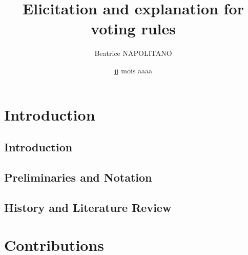 \documentclass[a4paper, 11pt,oneside]{book}
\title{Elicitation and explanation for voting rules}
\author{Beatrice NAPOLITANO}
\institute{l'Université Paris-Dauphine}
\date{jj mois aaaa}
\begin{document}
\hypersetup{pageanchor=false}
\begin{titlepage}
\maketitle{}
\end{titlepage}

\frontmatter

\begingroup
\hypersetup{hidelinks}

\tableofcontents

\listoffigures
{}

\listoftables
{}

\endgroup

\printglossary[toctitle=List of Abbreviations,title=List of Abbreviations,type=\acronymtype]

\mainmatter

\part{Introduction} 

	\chapter{Introduction}
		\label{ch:intro}
		
			
	\chapter{Preliminaries and Notation}
		\label{ch:preliminaries}
		
%		
	
	\chapter{History and Literature Review}
		
		
		

		
	
\part{Contributions}
	\label{part:info}
\end{document}
